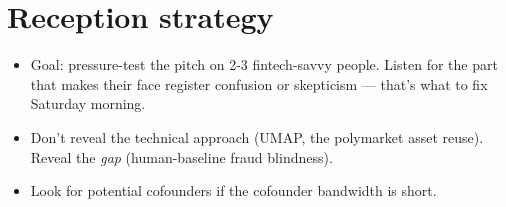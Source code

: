 \documentclass[11pt]{article}
\begin{document}
\section{Reception strategy}
\begin{itemize}
  \item Goal: pressure-test the pitch on 2-3 fintech-savvy people. Listen for the part that makes their face register confusion or skepticism --- that's what to fix Saturday morning.
  \item Don't reveal the technical approach (UMAP, the polymarket asset reuse). Reveal the \emph{gap} (human-baseline fraud blindness).
  \item Look for potential cofounders if the cofounder bandwidth is short.
\end{itemize}
\end{document}

